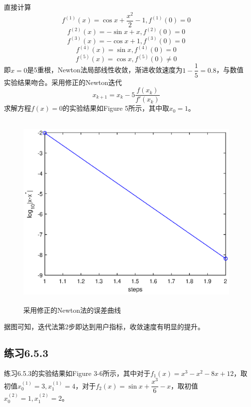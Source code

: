 \documentclass[UTF8,a4paper,10pt]{ctexart}
\begin{document}
        直接计算
        $$
        f^{(1)}(x)=\cos x+\dfrac{x^2}{2}-1,f^{(1)}(0)=0
        $$
        $$
        f^{(2)}(x)=-\sin x+x,f^{(2)}(0)=0
        $$
        $$
        f^{(3)}(x)=-\cos x+1,f^{(3)}(0)=0
        $$
        $$
        f^{(4)}(x)=\sin x,f^{(4)}(0)=0
        $$
        $$
        f^{(5)}(x)=\cos x,f^{(5)}(0)\neq 0
        $$
        即$x=0$是5重根，Newton法局部线性收敛，渐进收敛速度为$1-\dfrac{1}{5}=0.8$，与数值实验结果吻合。采用修正的Newton迭代
        $$
        x_{k+1}=x_k-5\dfrac{f(x_k)}{f'(x_k)}
        $$
        求解方程$f(x)=0$的实验结果如Figure 5所示，其中取$x_0=1$。
        \begin{figure}[htbp]
            \centering
            \includegraphics[width=14cm,height=10cm]{2_error_improved.eps}
            \caption{采用修正的Newton法的误差曲线}
        \end{figure}
        据图可知，迭代法第2步即达到用户指标，收敛速度有明显的提升。
        
    \subsection{练习6.5.3}
        \par
        练习6.5.3的实验结果如Figure 3-6所示，其中对于$f_1(x)=x^3-x^2-8x+12$，取初值$x_0^{(1)}=3,x_1^{(1)}=4$，对于$f_2(x)=\sin x+\dfrac{x^3}{6}-x$，取初值$x_0^{(2)}=1,x_1^{(2)}=2$。
\end{document}

